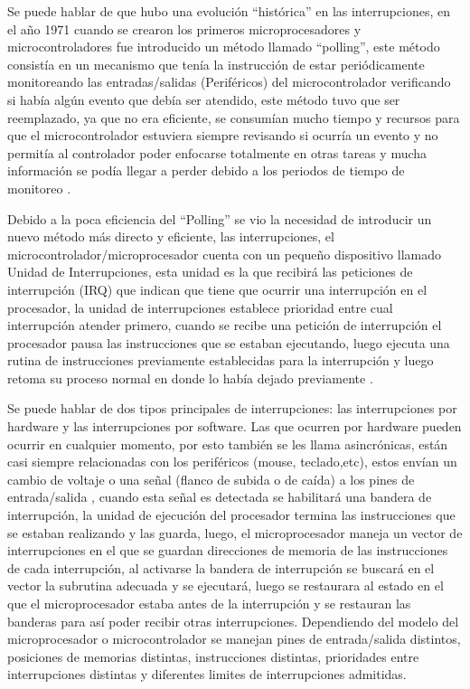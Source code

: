 \documentclass[11pt]{article}
\begin{document}
Se puede hablar de que hubo una evolución “histórica” en las interrupciones, en el año 1971 cuando se crearon los primeros microprocesadores y microcontroladores fue introducido un método llamado “polling”, este método consistía en un mecanismo que tenía la instrucción de estar periódicamente monitoreando las entradas/salidas (Periféricos) del microcontrolador verificando si había algún evento que debía ser atendido, este método tuvo que ser reemplazado, ya que no era eficiente, se consumían mucho tiempo y recursos para que el microcontrolador estuviera siempre revisando si ocurría un evento y no permitía al controlador poder enfocarse totalmente en otras tareas y mucha información se podía llegar a perder debido a los periodos de tiempo de monitoreo \cite{reyes2015arduino}.

Debido a la poca eficiencia del “Polling” se vio la necesidad de introducir un nuevo método más directo y eficiente, las interrupciones, el microcontrolador/microprocesador cuenta con un pequeño dispositivo llamado Unidad de Interrupciones, esta unidad es la que recibirá las peticiones de interrupción (IRQ) que indican que tiene que ocurrir una interrupción en el procesador, la unidad de interrupciones establece prioridad entre cual interrupción atender primero, cuando se recibe una petición de interrupción el procesador pausa las instrucciones que se estaban ejecutando, luego ejecuta una rutina de instrucciones previamente establecidas para la interrupción y luego retoma su proceso normal en donde lo había dejado previamente \cite{reyes2015arduino}.

Se puede hablar de dos tipos principales de interrupciones: las interrupciones por hardware y las interrupciones por software. Las que ocurren por hardware pueden ocurrir en cualquier momento, por esto también se les llama asincrónicas, están casi siempre relacionadas con  los periféricos (mouse, teclado,etc), estos envían un cambio de voltaje o una señal (flanco de subida o de caída) a los pines de entrada/salida , cuando esta señal es detectada se habilitará una bandera de interrupción, la unidad de ejecución del procesador termina las instrucciones que se estaban realizando y las guarda, luego, el microprocesador maneja un vector de interrupciones en el que se  guardan direcciones de memoria de las instrucciones de cada interrupción, al activarse la bandera de interrupción se buscará en el vector  la subrutina adecuada y se ejecutará, luego se restaurara al estado en el que el microprocesador estaba antes de la interrupción y se restauran las banderas para así poder recibir otras interrupciones. Dependiendo del modelo del microprocesador o microcontrolador se manejan pines de entrada/salida distintos, posiciones de memorias distintas, instrucciones distintas, prioridades entre interrupciones distintas y diferentes limites de interrupciones admitidas.
\end{document}
